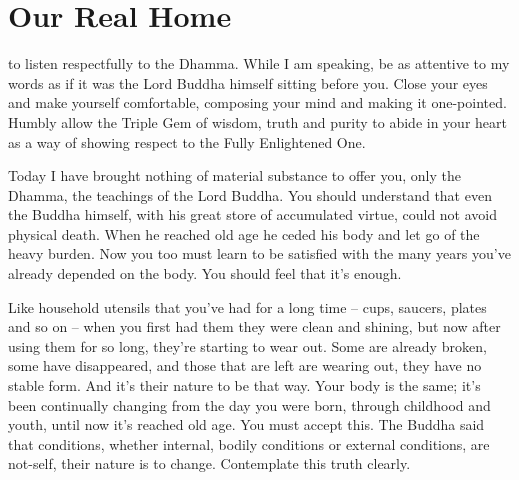 
\chapter{Our Real Home}

\vspace*{0.5\baselineskip}
 to listen respectfully to the Dhamma. While I am speaking, be as attentive to my words as if it was the Lord Buddha himself sitting before you. Close your eyes and make yourself comfortable, composing your mind and making it one-pointed. Humbly allow the Triple Gem of wisdom, truth and purity to abide in your heart as a way of showing respect to the Fully Enlightened One.

Today I have brought nothing of material substance to offer you, only the Dhamma, the teachings of the Lord Buddha. You should understand that even the Buddha himself, with his great store of accumulated virtue, could not avoid physical death. When he reached old age he ceded his body and let go of the heavy burden. Now you too must learn to be satisfied with the many years you've already depended on the body. You should feel that it's enough.

Like household utensils that you've had for a long time -- cups, saucers, plates and so on -- when you first had them they were clean and shining, but now after using them for so long, they're starting to wear out. Some are already broken, some have disappeared, and those that are left are wearing out, they have no stable form. And it's their nature to be that way. Your body is the same; it's been continually changing from the day you were born, through childhood and youth, until now it's reached old age. You must accept this. The Buddha said that conditions, whether internal, bodily conditions or external conditions, are not-self, their nature is to change. Contemplate this truth clearly.

